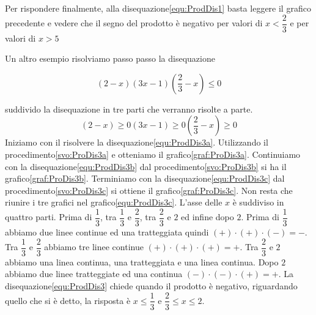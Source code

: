 Per rispondere finalmente, alla disequazione\nobs\vref{equ:ProdDis1} basta leggere il grafico precedente e vedere che il segno del prodotto è negativo per valori di $x<\dfrac{2}{3}$ e per valori di $x>5$

Un altro esempio risolviamo passo passo la disequazione
\begin{esempiot}{}{}
\begin{equation}
(2-x)(3x-1)(\dfrac{2}{3}-x)\leq 0\label{equ:ProdDis3}
\end{equation}
\end{esempiot}
suddivido la disequazione in tre parti che verranno risolte a parte.
%
\begin{subequations}
	\begin{equation}
	(2-x)\geq 0\label{equ:ProdDis3a}
	\end{equation}
	\begin{equation}
	(3x-1)\geq 0\label{equ:ProdDis3b}
	\end{equation}
	\begin{equation}
	(\dfrac{2}{3}-x)\geq 0\label{equ:ProdDis3c}
	\end{equation}
\end{subequations}
Iniziamo con il risolvere  la disequazione\nobs\vref{equ:ProdDis3a}. Utilizzando  il procedimento\nobs\vref{svo:ProDis3a} e otteniamo il grafico\nobs\vref{graf:ProDis3a}. Continuiamo con la disequazione\nobs\vref{equ:ProdDis3b} dal  procedimento\nobs\vref{svo:ProDis3b} si ha il grafico\nobs\vref{graf:ProDis3b}. Terminiamo  con la disequazione\nobs\vref{equ:ProdDis3c} dal  procedimento\nobs\vref{svo:ProDis3c} si ottiene il grafico\nobs\vref{graf:ProDis3c}. Non resta che riunire i tre grafici nel grafico\nobs\vref{equ:ProdDis3c}. L'asse delle $x$ è suddiviso in quattro parti. Prima di $\dfrac{1}{3}$, tra $\dfrac{1}{3}$ e $\dfrac{2}{3}$, tra $\dfrac{2}{3}$ e $2$ ed infine dopo $2$. Prima di $\dfrac{1}{3}$ abbiamo due linee continue ed una tratteggiata quindi $(+)\cdot(+)\cdot(-)=-$. Tra $\dfrac{1}{3}$ e $\dfrac{2}{3}$ abbiamo tre linee continue $(+)\cdot(+)\cdot(+)=+$. Tra $\dfrac{2}{3}$ e $2$ abbiamo una linea continua, una tratteggiata e una linea continua. Dopo $2$ abbiamo due linee tratteggiate ed una continua $(-)\cdot(-)\cdot(+)=+$.  La disequazione\nobs\vref{equ:ProdDis3} chiede quando il prodotto è negativo, riguardando quello che si è detto, la risposta è $x\leq \dfrac{1}{3}$ e $\dfrac{2}{3}\leq x \leq 2$.
